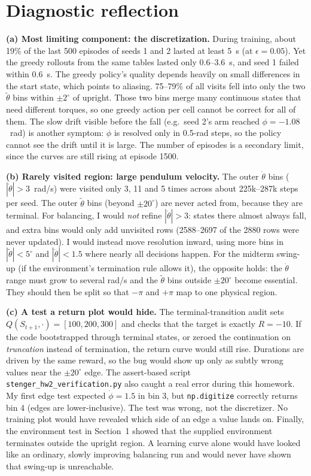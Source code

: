 \documentclass[11pt]{article}
\newcommand{\thw}{\tilde\theta}
\begin{document}
\section{Diagnostic reflection}

\textbf{(a) Most limiting component: the discretization.} During training, about
19\% of the last 500 episodes of seeds 1 and 2 lasted at least 5~s (at
$\epsilon=0.05$). Yet the greedy rollouts from the same tables lasted only
0.6--3.6~s, and seed 1 failed within 0.6~s. The greedy policy's quality depends
heavily on small differences in the start state, which points to aliasing. 75--79\%
of all visits fell into only the two $\thw$ bins within $\pm2^\circ$ of upright.
Those two bins merge many continuous states that need different torques, so one
greedy action per cell cannot be correct for all of them. The slow drift visible
before the fall (e.g.\ seed 2's arm reached $\phi=-1.08$~rad) is another symptom:
$\phi$ is resolved only in 0.5-rad steps, so the policy cannot see the drift until
it is large. The number of episodes is a secondary limit, since the curves are
still rising at episode 1500.

\textbf{(b) Rarely visited region: large pendulum velocity.} The outer
$\dot\theta$ bins ($|\dot\theta|>3$~rad/s) were visited only 3, 11 and 5 times
across about 225k--287k steps per seed. The outer $\thw$ bins (beyond $\pm20^\circ$)
are never acted from, because they are terminal. For balancing, I would
\emph{not} refine $|\dot\theta|>3$: states there almost always fall, and extra
bins would only add unvisited rows (2588--2697 of the 2880 rows were never
updated). I would instead move resolution inward, using more bins in
$|\thw|<5^\circ$ and $|\dot\theta|<1.5$ where nearly all decisions happen. For
the midterm swing-up (if the environment's termination rule allows it), the
opposite holds: the $\dot\theta$ range must grow to several rad/s and the
$\thw$ bins outside $\pm20^\circ$ become essential. They should then be split
so that $-\pi$ and $+\pi$ map to one physical region.

\textbf{(c) A test a return plot would hide.} The terminal-transition audit sets
$Q(S_{t+1},\cdot)=[100,200,300]$ and checks that the target is exactly
$R=-10$. If the code bootstrapped through terminal states, or zeroed the
continuation on \emph{truncation} instead of termination, the return curve would
still rise. Durations are driven by the same reward, so the bug would show up only
as subtly wrong values near the $\pm20^\circ$ edge. The assert-based script
\texttt{stenger\_hw2\_verification.py} also caught a real error during this
homework. My first edge test expected $\dot\phi=1.5$ in bin 3, but
\texttt{np.digitize} correctly returns bin 4 (edges are lower-inclusive). The
test was wrong, not the discretizer. No training plot would have revealed which
side of an edge a value lands on. Finally, the environment test in Section~1
showed that the supplied environment terminates outside the upright region. A
learning curve alone would have looked like an ordinary, slowly improving
balancing run and would never have shown that swing-up is unreachable.
\end{document}
